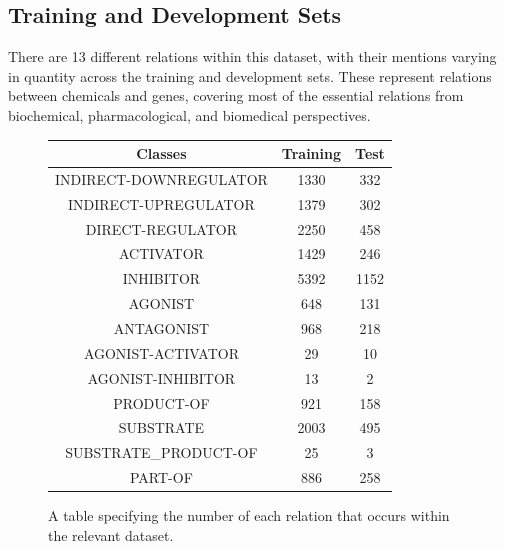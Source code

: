 \documentclass{l4proj}
\begin{document}

\subsection{Training and Development Sets}
There are 13 different relations within this dataset, with their mentions varying in quantity across the training and development sets. These represent relations between chemicals and genes, covering most of the essential relations from biochemical, pharmacological, and biomedical perspectives. 

\begin{figure}[h]
\begin{center}
\begin{tabular}{||c c c||} 
 \hline
 Classes & Training & Test\\ [0.5ex] 
 \hline\hline
 INDIRECT-DOWNREGULATOR & 1330 & 332 \\ 
 \hline
 INDIRECT-UPREGULATOR & 1379 & 302\\
 \hline
 DIRECT-REGULATOR & 2250 & 458\\ 
 \hline
 ACTIVATOR & 1429 & 246\\
 \hline
 INHIBITOR & 5392 & 1152\\ 
 \hline
 AGONIST & 648 & 131\\
 \hline
 ANTAGONIST & 968 & 218\\ 
 \hline
 AGONIST-ACTIVATOR & 29 & 10\\
 \hline
 AGONIST-INHIBITOR & 13 & 2\\ 
 \hline
 PRODUCT-OF & 921 & 158\\
 \hline
 SUBSTRATE & 2003 & 495\\ 
 \hline
 SUBSTRATE\_PRODUCT-OF & 25 & 3 \\
 \hline
 PART-OF & 886 & 258\\ 
 \hline
\end{tabular}
\caption{A table specifying the number of each relation that occurs within the relevant dataset.}
\end{center}
\end{figure}
\newpage
\end{document}
